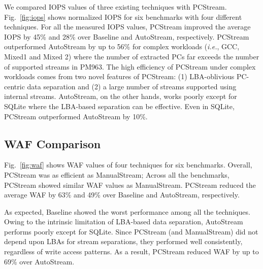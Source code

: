 We compared IOPS values of three existing techniques with \textsf{\small
PCStream}.  Fig.~\ref{fig:iops} shows normalized IOPS for six benchmarks with
four different techniques. For all the measured IOPS values,
\textsf{\small PCStream} improved the average IOPS by 45\% and 28\% over 
\textsf{\small Baseline} and \textsf{\small AutoStream}, respectively.
\textsf{\small PCStream} outperformed \textsf{\small AutoStream}
by up to 56\% for complex workloads ({\it i.e.}, GCC, Mixed1 and Mixed 2) where
the number of extracted PCs far exceeds the number of supported streams
in PM963. The high efficiency of \textsf{\small PCStream} under complex
workloads comes from two novel features of \textsf{\small PCStream}: (1) LBA-oblivious 
PC-centric data separation and (2) a large number of streams supported 
using internal streams. \textsf{\small AutoStream}, on the other hands,
works poorly except for SQLite where the LBA-based separation
can be effective.
Even in SQLite, \textsf{\small PCStream} outperformed \textsf{\small AutoStream}
by 10\%.

\vspace{-10pt}
\subsection{WAF Comparison}
\vspace{-5pt}

Fig.~\ref{fig:waf} shows WAF values of four techniques for six benchmarks.
Overall, \textsf{\small PCStream} was as efficient as \textsf{\small
ManualStream}; Across all the benchmarks, \textsf{\small PCStream} showed 
similar WAF values as \textsf{\small ManualStream}. \textsf{\small PCStream}
reduced the average WAF by 63\% and 49\% over \textsf{\small Baseline} and
\textsf{\small AutoStream}, respectively.  

As expected, \textsf{\small Baseline} showed the worst performance among all
the techniques. Owing to the intrinsic limitation of LBA-based data
separation, \textsf{\small AutoStream} performs poorly except for
SQLite.  Since \textsf{\small PCStream} (and \textsf{\small ManualStream}) did
not depend upon LBAs for stream separations, they performed well consistently,
regardless of write access patterns. As a result, \textsf{\small PCStream}
reduced WAF by up to 69\% over \textsf{\small AutoStream}.


